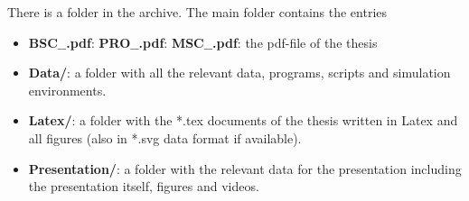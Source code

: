 \begin{appendix}
{	%
	There is a folder
 in the archive. The main folder contains the entries
	\begin{itemize}
		\item {}
		{\textbf{BSC$\_$\NummerDerArbeit$\_$\NachnameDesStudenten.pdf}:}{}
		{\textbf{PRO$\_$\NummerDerArbeit$\_$\NachnameDesStudenten.pdf}:}{}
		{\textbf{MSC$\_$\NummerDerArbeit$\_$\NachnameDesStudenten.pdf}:}{}
		the pdf-file of the thesis
		\item \textbf{Data/}: a folder with all the relevant data, programs, scripts and simulation environments.
		\item \textbf{Latex/}: a folder with the *.tex documents of the thesis
		written in Latex and all figures (also in *.svg data format if available).
		\item \textbf{Presentation/}: a folder with the relevant data for the presentation including the presentation itself, figures and videos.
	\end{itemize}
}{}





\end{appendix}
